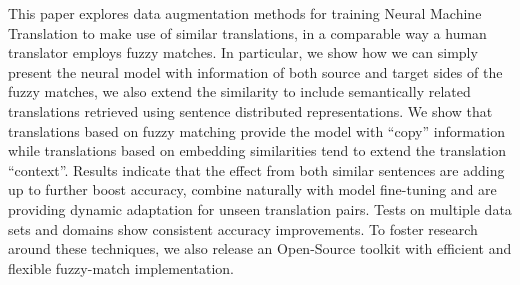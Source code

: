 This paper explores data augmentation methods for training Neural Machine Translation to make use of similar translations, in a comparable way a human translator employs fuzzy matches. In particular, we show how we can simply present the neural model with information of both source and target sides of the fuzzy matches, we also extend the similarity to include semantically related translations retrieved using sentence distributed representations. We show that translations based on fuzzy matching provide the model with ``copy'' information while translations based on embedding similarities tend to extend the translation ``context''. Results indicate that the effect from both similar sentences are adding up to further boost accuracy, combine naturally with model fine-tuning and are providing dynamic adaptation for unseen translation pairs. Tests on multiple data sets and domains show consistent accuracy improvements. To foster research around these techniques, we also release an Open-Source toolkit with efficient and flexible fuzzy-match implementation.
